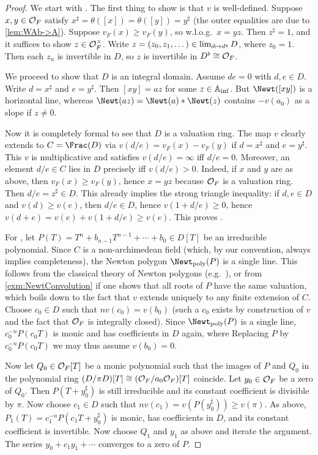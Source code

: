 \documentclass[a4paper, 10pt, oneside, DIV=9, chapterprefix=true, numbers=enddot,bibliography=totoc]{scrbook}
\begin{document}
\begin{proof}
	We start with . The first thing to show is that $v$ is well-defined. Suppose $x,y\in \mathcal{O}_F$ satisfy $x^\sharp=\theta([x])=\theta([y])=y^\sharp$ (the outer equalities are due to \cref{lem:WAb->A}). Suppose $v_F(x)\geq v_F(y)$, so w.l.o.g.\ $x=yz$. Then $z^\sharp=1$, and it suffices to show $z\in\mathcal{O}_F^\times$. Write $z=(z_0,z_1,\dotsc)\in\operatorname*{lim}_{d\mapsto d^q}D$, where $z_0=1$. Then each $z_n$ is invertible in $D$, so $z$ is invertible in $D^\flat\cong \mathcal{O}_F$.
	
	We proceed to show that $D$ is an integral domain. Assume $de=0$ with $d,e\in D$. Write $d=x^\sharp$ and $e=y^\sharp$. Then $[xy]=az$ for some $z\in \mathbb{A}_{\mathrm{inf}}$. But $\Newt([xy])$ is a horizontal line, whereas $\Newt(az)=\Newt(a)*\Newt(z)$ contains $-v(a_0)$ as a slope if $z\neq 0$.
	
	Now it is completely formal to see that $D$ is a valuation ring. The map $v$ clearly extends to $C=\Frac(D)$ via $v(d/e)=v_F(x)-v_F(y)$ if $d=x^\sharp$ and $e=y^\sharp$. This $v$ is multiplicative and satisfies $v(d/e)=\infty$ iff $d/e=0$. Moreover, an element $d/e\in C$ lies in $D$ precisely iff $v(d/e)>0$. Indeed, if $x$ and $y$ are as above, then $v_F(x)\geq v_F(y)$, hence $x=yz$ because $\mathcal{O}_F$ is a valuation ring. Then $d/e=z^\sharp\in D$. This already implies the strong triangle inequality: if $d,e\in D$ and $v(d)\geq v(e)$, then $d/e\in D$, hence $v(1+d/e)\geq 0$, hence $v(d+e)=v(e)+v(1+d/e)\geq v(e)$. This proves .
	
	For , let $P(T)=T^n+b_{n-1}T^{n-1}+\dotsb+b_0\in D[T]$ be an irreducible polynomial. Since $C$ is a non-archimedean field (which, by our convention, always implies completeness), the Newton polygon $\Newt_\poly(P)$ is a single line. This follows from the classical theory of Newton polygons (e.g.\ \cite[Ch.\:II\:(6.4)]{NEUKIRCH}), or from \cref{exm:NewtConvolution} if one shows that all roots of $P$ have the same valuation, which boils down to the fact that $v$ extends uniquely to any finite extension of $C$. Choose $c_0\in D$ such that $nv(c_0)=v(b_0)$ (such a $c_0$ exists by construction of $v$ and the fact that $\mathcal{O}_F$ is integrally closed). Since $\Newt_\poly(P)$ is a single line, $c_0^{-n}P(c_0T)$ is monic and has coefficients in $D$ again, where  Replacing $P$ by $c_0^{-n}P(c_0T)$ we may thus assume $v(b_0)=0$.
	
	Now let $Q_0\in\mathcal{O}_F[T]$ be a monic polynomial such that the images of $P$ and $Q_0$ in the polynomial ring $(D/\pi D)[T]\cong (\mathcal{O}_F/a_0\mathcal{O}_F)[T]$ coincide. Let $y_0\in \mathcal{O}_F$ be a zero of $Q_0$. Then $P(T+y_0^\sharp)$ is still irreducible and its constant coefficient is divisible by $\pi$. Now choose $c_1\in D$ such that $nv(c_1)=v(P(y_0^\sharp))\geq v(\pi)$. As above, $P_1(T)=c_1^{-n}P(c_1T+y_0^\sharp)$ is monic, has coefficients in $D$, and its constant coefficient is invertible. Now choose $Q_1$ and $y_1$ as above and iterate the argument. The series $y_0+c_1y_1+\dotsb$ converges to a zero of $P$.
\end{proof}
\end{document}
